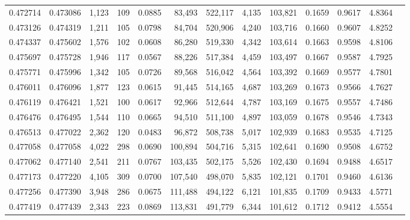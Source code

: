 \begin{tabular}{rrrrrrrrrrrrr}
0.472714 & 0.473086 & 1,123 &   109 &                                     0.0885 &  83,493 & 522,117 &   4,135 & 103,821 & 0.1659 & 0.9617 & 4.8364 \\
0.473126 & 0.474319 & 1,211 &   105 &                                     0.0798 &  84,704 & 520,906 &   4,240 & 103,716 & 0.1660 & 0.9607 & 4.8252 \\
0.474337 & 0.475602 & 1,576 &   102 &                                     0.0608 &  86,280 & 519,330 &   4,342 & 103,614 & 0.1663 & 0.9598 & 4.8106 \\
0.475697 & 0.475728 & 1,946 &   117 &                                     0.0567 &  88,226 & 517,384 &   4,459 & 103,497 & 0.1667 & 0.9587 & 4.7925 \\
0.475771 & 0.475996 & 1,342 &   105 &                                     0.0726 &  89,568 & 516,042 &   4,564 & 103,392 & 0.1669 & 0.9577 & 4.7801 \\
0.476011 & 0.476096 & 1,877 &   123 &                                     0.0615 &  91,445 & 514,165 &   4,687 & 103,269 & 0.1673 & 0.9566 & 4.7627 \\
0.476119 & 0.476421 & 1,521 &   100 &                                     0.0617 &  92,966 & 512,644 &   4,787 & 103,169 & 0.1675 & 0.9557 & 4.7486 \\
0.476476 & 0.476495 & 1,544 &   110 &                                     0.0665 &  94,510 & 511,100 &   4,897 & 103,059 & 0.1678 & 0.9546 & 4.7343 \\
0.476513 & 0.477022 & 2,362 &   120 &                                     0.0483 &  96,872 & 508,738 &   5,017 & 102,939 & 0.1683 & 0.9535 & 4.7125 \\
0.477058 & 0.477058 & 4,022 &   298 &                                     0.0690 & 100,894 & 504,716 &   5,315 & 102,641 & 0.1690 & 0.9508 & 4.6752 \\
0.477062 & 0.477140 & 2,541 &   211 &                                     0.0767 & 103,435 & 502,175 &   5,526 & 102,430 & 0.1694 & 0.9488 & 4.6517 \\
0.477173 & 0.477220 & 4,105 &   309 &                                     0.0700 & 107,540 & 498,070 &   5,835 & 102,121 & 0.1701 & 0.9460 & 4.6136 \\
0.477256 & 0.477390 & 3,948 &   286 &                                     0.0675 & 111,488 & 494,122 &   6,121 & 101,835 & 0.1709 & 0.9433 & 4.5771 \\
0.477419 & 0.477439 & 2,343 &   223 &                                     0.0869 & 113,831 & 491,779 &   6,344 & 101,612 & 0.1712 & 0.9412 & 4.5554 \\

\end{tabular}
